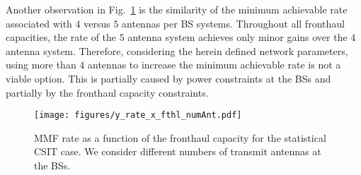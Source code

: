 \documentclass[12pt,draftcls,onecolumn]{IEEEtran}
\theoremstyle{remark}
\theoremstyle{definition}
\begin{document}
{Another observation in Fig.~\ref{y_rate_x_fthl_numAnt_im} is the similarity of the minimum achievable rate associated with $4$ versus $5$ antennas per BS systems. Throughout all fronthaul capacities, the rate of the $5$ antenna system achieves only minor gains over the $4$ antenna system. Therefore, considering the herein defined network parameters, using more than $4$ antennas to increase the minimum achievable rate is not a viable option. This is partially caused by power constraints at the BSs and partially by the fronthaul capacity constraints.
\begin{figure}
	\centering
	\texttt{[image: figures/y\_rate\_x\_fthl\_numAnt.pdf]}
	\caption{MMF rate as a function of the fronthaul capacity for the statistical CSIT case. We consider different numbers of transmit antennas at the BSs.}
	\label{y_rate_x_fthl_numAnt_im}
\end{figure}

}
\end{document}
